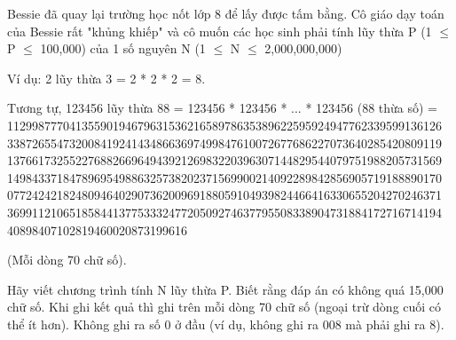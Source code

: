 Bessie đã quay lại trường học nốt lớp 8 để lấy được tấm bằng. Cô giáo dạy toán của Bessie rất "khủng khiếp" và cô muốn các học sinh phải tính lũy thừa P (1  $\le$  P  $\le$  100,000) của 1 số nguyên N (1  $\le$  N  $\le$  2,000,000,000)  

   Ví dụ: 2 lũy thừa 3 = 2 * 2 * 2 = 8.  

   Tương tự, 123456 lũy thừa 88 = 123456 * 123456 * ... * 123456 (88  thừa số) =  1129987770413559019467963153621658978635389622595924947762339599136126 3387265547320084192414348663697499847610072677686227073640285420809119 1376617325522768826696494392126983220396307144829544079751988205731569 1498433718478969549886325738202371569900214092289842856905719188890170 0772424218248094640290736200969188059104939824466416330655204270246371 3699112106518584413775333247720509274637795508338904731884172716714194 40898407102819460020873199616  

   (Mỗi dòng 70 chữ số).  

   Hãy viết chương trình tính N lũy thừa P. Biết rằng đáp án có không quá 15,000 chữ số. Khi ghi kết quả thì ghi trên mỗi dòng 70 chữ số (ngoại trừ dòng cuối có thể ít hơn). Không ghi ra số 0 ở đầu (ví dụ, không ghi ra  008 mà phải ghi ra 8).  

\